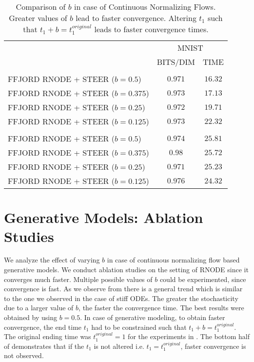 \begin{table}[ht!]
	\centering
	\begin{tabular}{l c c }
		\toprule
		& \multicolumn{2}{c}{MNIST} \\
		& BITS/DIM & TIME \\
		\midrule
		\hdashline
		\multicolumn{3}{c}{$t_1:t_1+b=t_1^{original}=1$} \\
		\hdashline
		FFJORD RNODE + STEER ($b=0.5$) & $0.971$ & $16.32$ \\
		FFJORD RNODE + STEER ($b=0.375$) & $0.973$ & $17.13$  \\
		FFJORD RNODE + STEER ($b=0.25$) & $0.972$ & $19.71$  \\
		FFJORD RNODE + STEER ($b=0.125$) & $0.973$ & $22.32$  \\
		\hdashline
		\multicolumn{3}{c}{$t_1:t_1=t_1^{original}=1$} \\
		\hdashline
		FFJORD RNODE + STEER ($b=0.5$) & $0.974$ & $25.81$ \\
		FFJORD RNODE + STEER ($b=0.375$) & $0.98$ & $25.72$  \\
		FFJORD RNODE + STEER ($b=0.25$) & $0.971$ & $25.23$  \\
		FFJORD RNODE + STEER ($b=0.125$) & $0.976$ & $24.32$  \\
		\bottomrule %
	\end{tabular}
	\caption{Comparison of $b$ in case of Continuous Normalizing Flows. Greater values of $b$ lead to faster convergence. Altering $t_1$ such that $t_1+b=t_1^{original}$ leads to faster convergence times.}  %
	\label{tab:b_comparison_cnf_results}
\end{table}


\section{Generative Models: Ablation Studies}
\vspace{-3pt}
We analyze the effect of varying $b$ in case of continuous normalizing flow based generative models. We conduct ablation studies on the setting of RNODE \cite{finlay2020train} since it converges much faster. Multiple possible values of $b$ could be experimented, since convergence is fast. 
As we observe from  there is a general trend which is similar to the one we observed in the case of stiff ODEs. The greater the stochasticity due to a larger value of $b$, the faster the convergence time. The best results were obtained by using $b=0.5$. In case of generative modeling, to obtain faster convergence, the end time $t_1$ had to be constrained such that $t_1+b=t_1^{original}$. The original ending time was $t_1^{original}=1$ for the experiments in .  The bottom half of   demonstrates that if the $t_1$ is not altered i.e. $t_1=t_1^{original}$, faster convergence is not observed. 